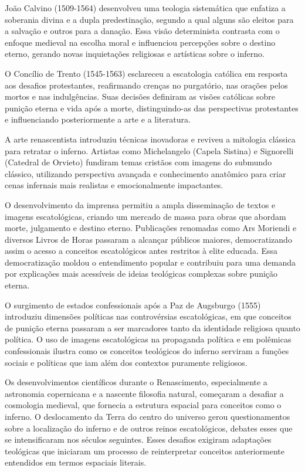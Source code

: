 João Calvino (1509-1564) desenvolveu uma teologia sistemática que enfatiza a soberania divina e a dupla predestinação, segundo a qual alguns são eleitos para a salvação e outros para a danação. Essa visão determinista contrasta com o enfoque medieval na escolha moral e influenciou percepções sobre o destino eterno, gerando novas inquietações religiosas e artísticas sobre o inferno.

O Concílio de Trento (1545-1563) esclareceu a escatologia católica em resposta aos desafios protestantes, reafirmando crenças no purgatório, nas orações pelos mortos e nas indulgências. Suas decisões definiram as visões católicas sobre punição eterna e vida após a morte, distinguindo-as das perspectivas protestantes e influenciando posteriormente a arte e a literatura.

A arte renascentista introduziu técnicas inovadoras e reviveu a mitologia clássica para retratar o inferno. Artistas como Michelangelo (Capela Sistina) e Signorelli (Catedral de Orvieto) fundiram temas cristãos com imagens do submundo clássico, utilizando perspectiva avançada e conhecimento anatômico para criar cenas infernais mais realistas e emocionalmente impactantes.

O desenvolvimento da imprensa permitiu a ampla disseminação de textos e imagens escatológicas, criando um mercado de massa para obras que abordam morte, julgamento e destino eterno. Publicações renomadas como Ars Moriendi e diversos Livros de Horas passaram a alcançar públicos maiores, democratizando assim o acesso a conceitos escatológicos antes restritos à elite educada. Essa democratização moldou o entendimento popular e contribuiu para uma demanda por explicações mais acessíveis de ideias teológicas complexas sobre punição eterna.

O surgimento de estados confessionais após a Paz de Augsburgo (1555) introduziu dimensões políticas nas controvérsias escatológicas, em que conceitos de punição eterna passaram a ser marcadores tanto da identidade religiosa quanto política. O uso de imagens escatológicas na propaganda política e em polêmicas confessionais ilustra como os conceitos teológicos do inferno serviram a funções sociais e políticas que iam além dos contextos puramente religiosos.

Os desenvolvimentos científicos durante o Renascimento, especialmente a astronomia copernicana e a nascente filosofia natural, começaram a desafiar a cosmologia medieval, que fornecia a estrutura espacial para conceitos como o inferno. O deslocamento da Terra do centro do universo gerou questionamentos sobre a localização do inferno e de outros reinos escatológicos, debates esses que se intensificaram nos séculos seguintes. Esses desafios exigiram adaptações teológicas que iniciaram um processo de reinterpretar conceitos anteriormente entendidos em termos espaciais literais.

